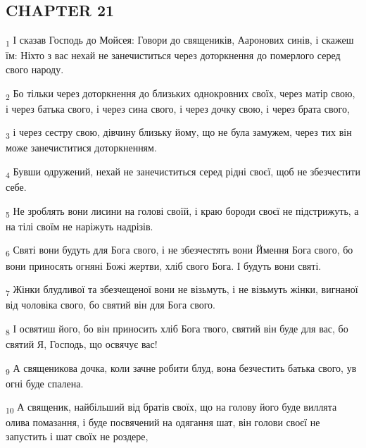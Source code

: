 \subsection{CHAPTER 21}
\begin{tcolorbox}
\textsubscript{1} І сказав Господь до Мойсея: Говори до священиків, Ааронових синів, і скажеш їм: Ніхто з вас нехай не занечиститься через доторкнення до померлого серед свого народу.
\end{tcolorbox}
\begin{tcolorbox}
\textsubscript{2} Бо тільки через доторкнення до близьких однокровних своїх, через матір свою, і через батька свого, і через сина свого, і через дочку свою, і через брата свого,
\end{tcolorbox}
\begin{tcolorbox}
\textsubscript{3} і через сестру свою, дівчину близьку йому, що не була замужем, через тих він може занечиститися доторкненням.
\end{tcolorbox}
\begin{tcolorbox}
\textsubscript{4} Бувши одружений, нехай не занечиститься серед рідні своєї, щоб не збезчестити себе.
\end{tcolorbox}
\begin{tcolorbox}
\textsubscript{5} Не зроблять вони лисини на голові своїй, і краю бороди своєї не підстрижуть, а на тілі своїм не наріжуть надрізів.
\end{tcolorbox}
\begin{tcolorbox}
\textsubscript{6} Святі вони будуть для Бога свого, і не збезчестять вони Ймення Бога свого, бо вони приносять огняні Божі жертви, хліб свого Бога. І будуть вони святі.
\end{tcolorbox}
\begin{tcolorbox}
\textsubscript{7} Жінки блудливої та збезчещеної вони не візьмуть, і не візьмуть жінки, вигнаної від чоловіка свого, бо святий він для Бога свого.
\end{tcolorbox}
\begin{tcolorbox}
\textsubscript{8} І освятиш його, бо він приносить хліб Бога твого, святий він буде для вас, бо святий Я, Господь, що освячує вас!
\end{tcolorbox}
\begin{tcolorbox}
\textsubscript{9} А священикова дочка, коли зачне робити блуд, вона безчестить батька свого, ув огні буде спалена.
\end{tcolorbox}
\begin{tcolorbox}
\textsubscript{10} А священик, найбільший від братів своїх, що на голову його буде виллята олива помазання, і буде посвячений на одягання шат, він голови своєї не запустить і шат своїх не роздере,
\end{tcolorbox}
